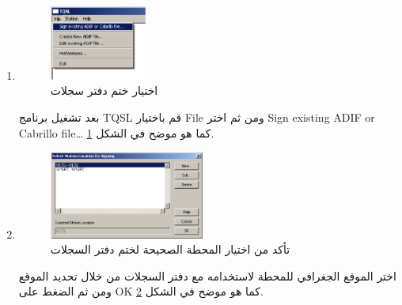\documentclass[a4paper,12pt]{article}
\begin{document}
	\begin{enumerate}
		\item
			\begin{figure}[!hbtp]
			\centering
			\includegraphics[width=0.30\textwidth]{signnew.eps}
			\caption{اختيار ختم دفتر سجلات}
			\label{fig:SignNew}
			\end{figure}
			بعد تشغيل برنامج \textenglish{TQSL} قم باختيار \textenglish{File} ومن ثم اختر \textenglish{Sign existing ADIF or Cabrillo file\ldots{}} كما هو موضح في الشكل \ref{fig:SignNew}.
\clearpage
		\item
			\begin{figure}[!hbtp]
			\centering
			\includegraphics[width=0.48\textwidth]{signselectstation.eps}
			\caption{تأكد من اختيار المحطة الصحيحة لختم دفتر السجلات}
			\label{fig:SignStation}
			\end{figure}
		  اختر الموقع الجغرافي للمحطة لاستخدامه مع دفتر السجلات من خلال تحديد
		  الموقع ومن ثم الضغط على \textenglish{OK} كما هو موضح في الشكل \ref{fig:SignStation}.


\end{enumerate}
\end{document}
